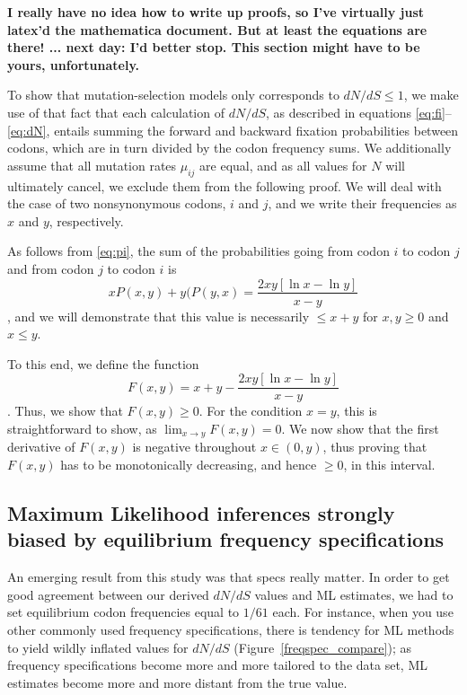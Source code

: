 \documentclass[11pt]{article}
\begin{document}
\textbf{I really have no idea how to write up proofs, so I've virtually just latex'd the mathematica document. But at least the equations are there! ... next day: I'd better stop. This section might have to be yours, unfortunately.}

To show that mutation-selection models only corresponds to $dN/dS \leq 1$, we make use of that fact that each calculation of $dN/dS$, as described in equations \eqref{eq:fi}--\eqref{eq:dN}, entails summing the forward and backward fixation probabilities between codons, which are in turn divided by the codon frequency sums. We additionally assume that all mutation rates $\mu_{ij}$ are equal, and as all values for $N$ will ultimately cancel, we exclude them from the following proof. We will deal with the case of two nonsynonymous codons, $i$ and $j$, and we write their frequencies as $x$ and $y$, respectively.

As follows from \eqref{eq:pi}, the sum of the probabilities going from codon $i$ to codon $j$ and from codon $j$ to codon $i$ is \begin{equation} xP(x,y) + y(P(y,x) = \frac{2xy [\ln x - \ln y]}{x - y}\end{equation}, and we will demonstrate that this value is necessarily $\leq x + y$ for $x,y \geq 0$ and $x \leq y$.

To this end, we define the function \begin{equation} F(x,y) = x + y - \frac{2xy [\ln x - \ln y]}{x - y} \end{equation}. Thus, we show that $F(x,y) \geq 0$. For the condition $x=y$, this is straightforward to show, as $\lim_{x \to y}F(x,y) = 0$.
We now show that the first derivative of $F(x, y)$ is negative throughout $x \in (0,y)$, thus proving that $F(x, y)$ has to be monotonically decreasing, and hence $\geq0$, in this interval.


\subsection*{Maximum Likelihood inferences strongly biased by equilibrium frequency specifications}

An emerging result from this study was that specs really matter. In order to get good agreement between our derived $dN/dS$ values and ML estimates, we had to set equilibrium codon frequencies equal to $1/61$ each. For instance, when you use other commonly used frequency specifications, there is tendency for ML methods to yield wildly inflated values for $dN/dS$ (Figure~\ref{freqspec_compare}); as frequency specifications become more and more tailored to the data set, ML estimates become more and more distant from the true value.
\end{document}
